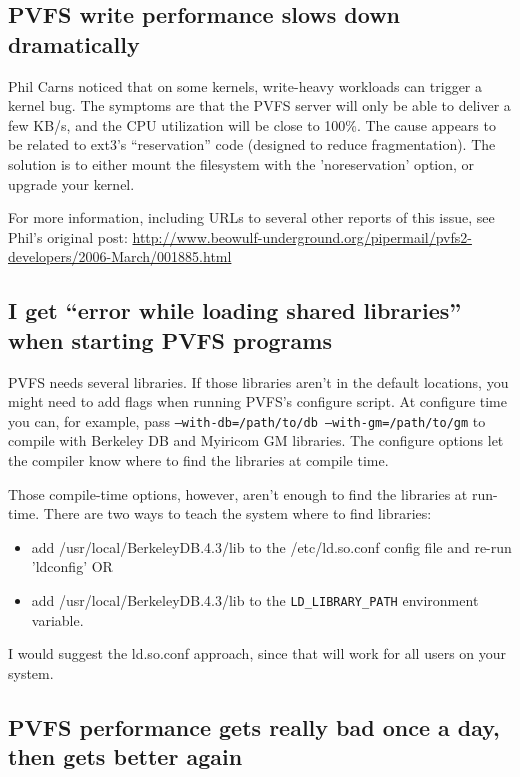 \documentclass[11pt,letterpaper]{article}
\begin{document}
\subsection{PVFS write performance slows down dramatically}
\label{sec:write_slowdown}

Phil Carns noticed that on some kernels, write-heavy workloads can trigger a
kernel bug.   The symptoms are that the PVFS server will only be able to
deliver a few KB/s, and the CPU utilization will be close to 100\%.  The cause
appears to be related to ext3's ``reservation'' code (designed to reduce
fragmentation).  The solution is to either mount the filesystem with the
'noreservation' option, or upgrade your kernel.  

For more information, including URLs to several other reports of this issue, see Phil's original post:  
\url{http://www.beowulf-underground.org/pipermail/pvfs2-developers/2006-March/001885.html}

\subsection{I get ``error while loading shared libraries'' when starting PVFS programs}

PVFS needs several libraries.  If those libraries aren't in the default
locations, you might need to add flags when running PVFS's configure script.
At configure time you can, for example, pass \texttt{--with-db=/path/to/db
--with-gm=/path/to/gm} to compile with Berkeley DB and Myiricom GM libraries.
The configure options let the compiler know where to find the libraries at
compile time.  

Those compile-time options, however, aren't enough to find the libraries at
run-time.  There are two ways to teach the system where to find libraries:  

\begin{itemize}
\item add /usr/local/BerkeleyDB.4.3/lib to the /etc/ld.so.conf config file
  and re-run 'ldconfig' OR
\item add /usr/local/BerkeleyDB.4.3/lib to the \texttt{LD\_LIBRARY\_PATH}
    environment variable.
\end{itemize}

I would suggest the ld.so.conf approach, since that will work for all users on
your system.

\subsection{PVFS performance gets really bad once a day, then gets
     better again}
\label{sec:cron-indexing}
\end{document}
